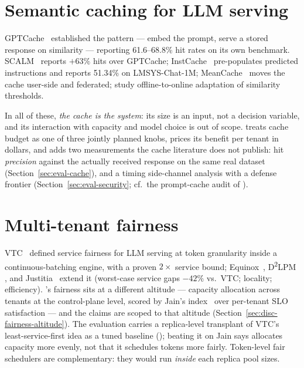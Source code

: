 \section{Semantic caching for LLM serving}

GPTCache~\citep{gptcache2023} established the pattern --- embed the prompt,
serve a stored response on similarity --- reporting 61.6--68.8\% hit rates on
its own benchmark. SCALM~\citep{scalm2024} reports $+63\%$ hits over
GPTCache; InstCache~\citep{instcache2024} pre-populates predicted
instructions and reports 51.34\% on LMSYS-Chat-1M;
MeanCache~\citep{meancache2024} moves the cache user-side and federated;
\citet{semcacheadapt2025} study offline-to-online adaptation of similarity
thresholds.

In all of these, \emph{the cache is the system}: its size is an input, not a
decision variable, and its interaction with capacity and model choice is out
of scope. \polyforge{} treats cache budget as one of three jointly planned
knobs, prices its benefit per tenant in dollars, and adds two measurements
the cache literature does not publish: hit \emph{precision} against the
actually received response on the same real dataset
(Section~\ref{sec:eval-cache}), and a timing side-channel analysis with a
defense frontier (Section~\ref{sec:eval-security};
cf.~the prompt-cache audit of \citet{promptcacheaudit2025}).

\section{Multi-tenant fairness}

VTC~\citep{vtc2024} defined service fairness for LLM serving at token
granularity inside a continuous-batching engine, with a proven $2\times$
service bound; Equinox~\citep{equinox2025}, D\textsuperscript{2}LPM
\citep{d2lpm2025}, and Justitia~\citep{justitia2025} extend it (worst-case
service gaps $-42\%$ vs.\ VTC; locality; efficiency). \polyforge{}'s fairness
sits at a different altitude --- capacity allocation across tenants at the
control-plane level, scored by Jain's index~\citep{jain1984} over per-tenant
SLO satisfaction --- and the claims are scoped to that altitude
(Section~\ref{sec:disc-fairness-altitude}). The evaluation carries a
replica-level transplant of VTC's least-service-first idea as a tuned
baseline (); beating it on Jain says \polyforge{}
allocates capacity more evenly, not that it schedules tokens more fairly.
Token-level fair schedulers are complementary: they would run \emph{inside}
each replica pool \polyforge{} sizes.

